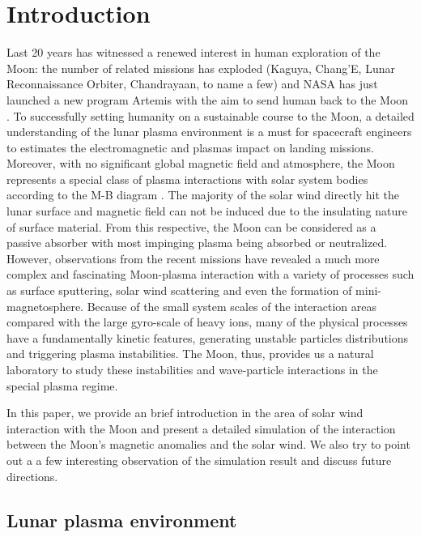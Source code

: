 
\chapter{Introduction}

Last 20 years has witnessed a renewed interest in human exploration of the Moon: the number of related missions has exploded (Kaguya, Chang'E, Lunar Reconnaissance Orbiter, Chandrayaan, to name a few) and NASA has just launched a new program Artemis with the aim to send human back to the Moon \citep{nasaNASALunarExploration2020, nasaNASAStrategicPlan2018}. To successfully setting humanity on a sustainable course to the Moon, a detailed understanding of the lunar plasma environment is a must for spacecraft engineers to estimates the electromagnetic and plasmas impact on landing missions. Moreover, with no significant global magnetic field and atmosphere, the Moon represents a special class of plasma interactions with solar system bodies according to the M-B diagram \citep{barabashClassesSolarWind2012}. The majority of the solar wind directly hit the lunar surface and magnetic field can not be induced due to  the insulating nature of surface material. From this respective, the Moon can be considered as a passive absorber with most impinging plasma being absorbed or neutralized. However, observations from the recent missions have revealed a much more complex and fascinating Moon-plasma interaction with a variety of processes  such as surface sputtering, solar wind scattering and even the formation of mini-magnetosphere. Because of the small system scales of the interaction areas compared with the large gyro-scale of heavy ions, many of the physical processes have a fundamentally kinetic features, generating unstable particles distributions and triggering plasma instabilities. The Moon, thus, provides us a natural laboratory to study these instabilities and wave-particle interactions in the special plasma regime.

In this paper, we provide an brief introduction in the area of solar wind interaction with the Moon and present a detailed simulation of the interaction between the Moon's magnetic anomalies and the solar wind. We also try to point out a a few interesting observation of the simulation result and discuss future directions.



\section{Lunar plasma environment}

